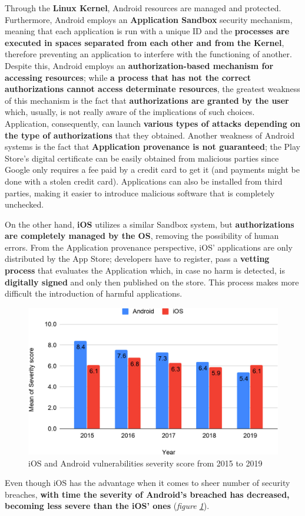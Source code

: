 Through the \textbf{Linux Kernel}, Android resources are managed and protected. Furthermore, Android employs an \textbf{Application Sandbox} security mechanism, meaning that each application is run with a unique ID and the \textbf{processes are executed in spaces separated from each other and from the Kernel}, therefore preventing an application to interfere with the functioning of another. Despite this, Android employs an \textbf{authorization-based mechanism for accessing resources}; while \textbf{a process that has not the correct authorizations cannot access determinate resources}, the greatest weakness of this mechanism is the fact that \textbf{authorizations are granted by the user} which, usually, is not really aware of the implications of such choices. Application, consequently, can launch \textbf{various types of attacks depending on the type of authorizations} that they obtained. Another weakness of Android systems is the fact that \textbf{Application provenance is not guaranteed}; the Play Store's digital certificate can be easily obtained from malicious parties since Google only requires a fee paid by a credit card to get it (and payments might be done with a stolen credit card). Applications can also be installed from third parties, making it easier to introduce malicious software that is completely unchecked.

On the other hand, \textbf{iOS} utilizes a similar Sandbox system, but \textbf{authorizations are completely managed by the OS}, removing the possibility of human errors. From the Application provenance perspective, iOS' applications are only distributed by the App Store; developers have to register, pass a \textbf{vetting process} that evaluates the Application which, in case no harm is detected, is \textbf{digitally signed} and only then published on the store. This process makes more difficult the introduction of harmful applications.
\begin{figure}[H]
    \centering
    \includegraphics[scale=1.2]{document/chapters/chapter_3/images/mobile_vulnerabilities_severity.jpg}
    \caption{iOS and Android vulnerabilities severity score from 2015 to 2019 \cite{mobile_security}}
    \label{fig:mobile_vulnerabilities_severity}
\end{figure}
Even though iOS has the advantage when it comes to sheer number of security breaches, \textbf{with time the severity of Android's breached has decreased, becoming less severe than the iOS' ones} (\textit{figure \ref{fig:mobile_vulnerabilities_severity}}).

